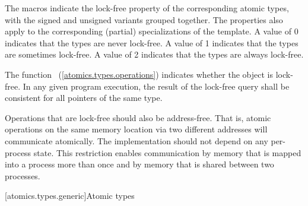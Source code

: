 \pnum
The  macros indicate the lock-free property of the
corresponding atomic types, with the signed and unsigned variants grouped
together. The properties also apply to the corresponding (partial) specializations of the
 template. A value of 0 indicates that the types are never
lock-free. A value of 1 indicates that the types are sometimes lock-free. A
value of 2 indicates that the types are always lock-free.

\pnum
The function ~(\ref{atomics.types.operations})
indicates whether the object is lock-free. In any given program execution, the
result of the lock-free query shall be consistent for all pointers of the same
type.

\pnum
\enternote Operations that are lock-free should also be address-free. That is,
atomic operations on the same memory location via two different addresses will
communicate atomically. The implementation should not depend on any
per-process state. This restriction enables communication  by memory that is
mapped into a process more than once and by memory that is shared between two
processes. \exitnote

[atomics.types.generic]{Atomic types}

